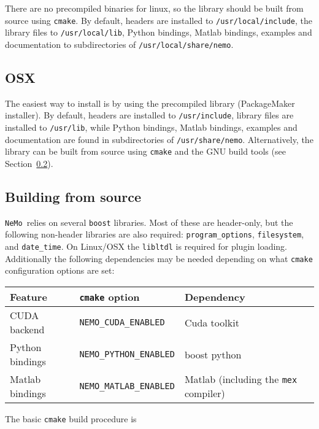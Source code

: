 \documentclass[a4paper]{article}
\newcommand{\nemo}{\texttt{NeMo}}
\newcommand{\command}[1]{\texttt{#1}}
\newcommand{\file}[1]{\texttt{#1}}
\newcommand{\directory}[1]{\texttt{#1}}
\newcommand{\library}[1]{\texttt{#1}}
\begin{document}
There are no precompiled binaries for linux,
	so the library should be built from source using \command{cmake}.
By default,
	headers are installed to \file{/usr/local/include},
	the library files to \file{/usr/local/lib},
	Python bindings, Matlab bindings, examples and documentation to subdirectories of \directory{/usr/local/share/nemo}.

\subsection{OSX}

The easiest way to install is by using the precompiled library (PackageMaker installer).
By default,
	headers are installed to \directory{/usr/include},
	library files are installed to \directory{/usr/lib},
	while
	Python bindings, Matlab bindings, examples and documentation are found in subdirectories of \directory{/usr/share/nemo}.
Alternatively, the library can be built from source using \command{cmake} and the GNU build tools (see Section~\ref{source_build}).

\subsection{Building from source}
\label{source_build}

\nemo\ relies on several \library{boost} libraries.
Most of these are header-only, but the following non-header libraries are also required:
	\library{program\_options}, \library{filesystem}, and \library{date\_time}.
On Linux/OSX the \library{libltdl} is required for plugin loading.
Additionally the following dependencies may be needed depending on what \command{cmake} configuration options are set: 

\begin{tabular}{p{}lp{}}
\hline
Feature & \command{cmake} option & Dependency \\
\hline
CUDA backend & \command{NEMO\_CUDA\_ENABLED} & Cuda toolkit \\
Python bindings & \command{NEMO\_PYTHON\_ENABLED} & boost python \\
Matlab bindings & \command{NEMO\_MATLAB\_ENABLED} & Matlab (including the \command{mex} compiler) \\
\hline
\end{tabular}


The basic \command{cmake} build procedure is 
\end{document}
